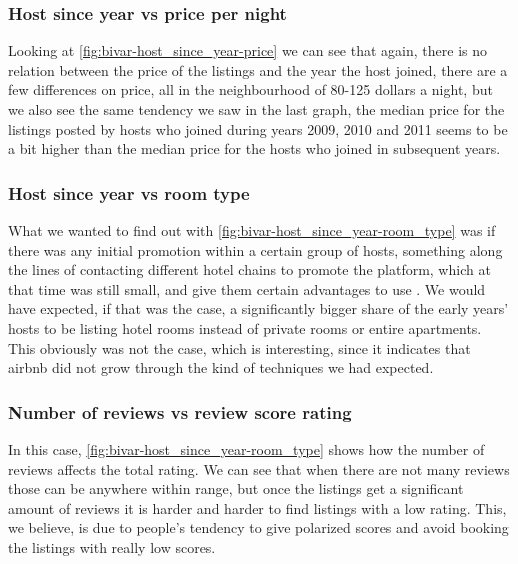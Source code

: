 \pagebreak
\subsubsection{Host since year vs price per night}


Looking at \cref{fig:bivar-host_since_year-price} we can see that again, there is no relation between the price of the listings and the year the host joined, there are a few differences on price, all in the neighbourhood of 80-125 dollars a night, but we also see the same tendency we saw in the last graph, the median price for the listings posted by hosts who joined during years 2009, 2010 and 2011 seems to be a bit higher than the median price for the hosts who joined in subsequent years.
\pagebreak

\subsubsection{Host since year vs room type}


What we wanted to find out with \cref{fig:bivar-host_since_year-room_type} was if there was any initial promotion within a certain group of hosts, something along the lines of contacting different hotel chains to promote the platform, which at that time was still small, and give them certain advantages to use \airbnb.
We would have expected, if that was the case, a significantly bigger share of the early years' hosts to be listing hotel rooms instead of private rooms or entire apartments.
This obviously was not the case, which is interesting, since it indicates that airbnb did not grow through the kind of techniques we had expected.


\pagebreak
\subsubsection{Number of reviews vs review score rating}


 In this case, \cref{fig:bivar-host_since_year-room_type} shows how the number of reviews affects the total rating. We can see that when there are not many reviews those can be anywhere within range, but once the listings get a significant amount of reviews it is harder and harder to find listings with a low rating. This, we believe, is due to people's tendency to give polarized scores and avoid booking the listings with really low scores. 

